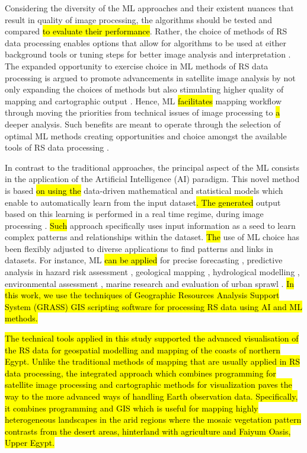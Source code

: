 \documentclass[final,5p,times,twocolumn]{elsarticle}
\begin{document}
Considering the diversity of the ML approaches and their existent nuances that result in quality of image processing, the algorithms\hl{ }should be tested and compared \hl{to evaluate their performance}. Rather, the choice of methods of RS data processing enables options that allow for algorithms to be used at either background tools or tuning steps for better image analysis and interpretation \cite{rs16010184,Lemenkova202310,rs16010127}. The expanded opportunity to exercise choice in ML methods of RS data processing is argued to promote advancements in satellite image analysis by not only expanding the choices of methods\hl{ }but also stimulating higher quality of mapping and cartographic output \cite{TSELKA2023131,Lemenkova202021,10292983}. Hence,\hl{ }ML\hl{ facilitates} mapping workflow through moving the priorities from technical issues of image processing to \hl{a} deeper analysis. Such benefits are meant to operate through the selection of optimal ML methods creating opportunities and choice amongst the available tools of RS data processing \cite{WU2023110723}.

In contrast to the traditional approaches, the principal aspect of the ML consists in the application of the Artificial Intelligence (AI) paradigm. This novel method is based \hl{on using the} data-driven mathematical and statistical models which enable\hl{ }to automatically learn from the input dataset\hl{. The generated }output based on this learning\hl{ }is performed in a real time regime, during\hl{ }image processing\hl{ }\cite{DOSSANTOS2022106753,ROCHA2022107415}. \hl{Such} approach specifically uses input information as a seed to learn complex patterns and relationships within the dataset. \hl{The} use of ML choice has been\hl{ }flexibly adjusted to diverse applications to find patterns and links in datasets. For instance,\hl{ }ML \hl{can be applied} for precise forecasting \cite{LATIF202316}, predictive analysis in hazard risk assessment \cite{XIONG2021145256,WU2024103612}, geological mapping \cite{HAN202387}, hydrological modelling \cite{RAFIK2023101569,AOURAGH2023100939}, environmental assessment \cite{AMANI2023108324}, marine research \cite{ERDEM2021964} and evaluation of urban sprawl \cite{LI2023104653}. \hl{In this work, we use the techniques of Geographic Resources Analysis Support System (GRASS) GIS scripting software for processing RS data using AI and ML methods.}

\hl{The technical tools applied in this study supported the advanced visualisation of the RS data for geospatial modelling and mapping of the coasts of northern Egypt. Unlike the traditional methods of mapping that are usually applied in RS data processing, the integrated approach which combines programming for satellite image processing and cartographic methods for visualization paves the way to the more advanced ways of handling Earth observation data. Specifically, it combines programming and GIS which is useful for mapping highly heterogeneous landscapes in the arid regions where the mosaic vegetation pattern contrasts from the desert areas, hinterland with agriculture and Faiyum Oasis, Upper Egypt. }
\end{document}
